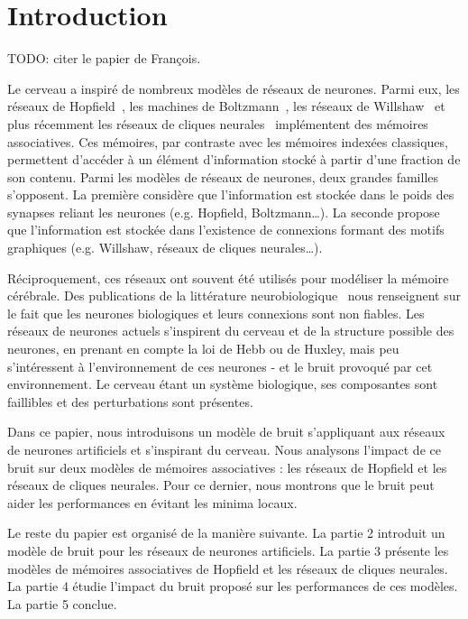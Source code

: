 \documentclass{gretsi}
\begin{document}
\maketitle

\section{Introduction}

TODO: citer le papier de François.

Le cerveau a inspiré de nombreux modèles de réseaux de neurones. Parmi eux, les réseaux de Hopfield~\cite{}, les machines de Boltzmann~\cite{}, les réseaux de Willshaw~\cite{} et plus récemment les réseaux de cliques neurales~\cite{} implémentent des mémoires associatives. Ces mémoires, par contraste avec les mémoires indexées classiques, permettent d'accéder à un élément d'information stocké à partir d'une fraction de son contenu. Parmi les modèles de réseaux de neurones, deux grandes familles s'opposent. La première considère que l'information est stockée dans le poids des synapses reliant les neurones (e.g. Hopfield, Boltzmann\dots). La seconde propose que l'information est stockée dans l'existence de connexions formant des motifs graphiques (e.g. Willshaw, réseaux de cliques neurales\dots).

Réciproquement, ces réseaux ont souvent été utilisés pour modéliser la mémoire cérébrale. Des publications de la littérature neurobiologique~\cite{} nous renseignent sur le fait que les neurones biologiques et leurs connexions sont non fiables. Les réseaux de neurones actuels s'inspirent du cerveau et de la structure possible des neurones, en prenant en compte la loi de Hebb ou de Huxley, mais peu s'intéressent à l'environnement de ces neurones - et le bruit provoqué par cet environnement. Le cerveau étant un système biologique, ses composantes sont faillibles et des perturbations sont présentes.

Dans ce papier, nous introduisons un modèle de bruit s'appliquant aux réseaux de neurones artificiels et s'inspirant du cerveau. Nous analysons l'impact de ce bruit sur deux modèles de mémoires associatives : les réseaux de Hopfield et les réseaux de cliques neurales. Pour ce dernier, nous montrons que le bruit peut aider les performances en évitant les minima locaux.

Le reste du papier est organisé de la manière suivante. La partie 2 introduit un modèle de bruit pour les réseaux de neurones artificiels. La partie 3 présente les modèles de mémoires associatives de Hopfield et les réseaux de cliques neurales. La partie 4 étudie l'impact du bruit proposé sur les performances de ces modèles. La partie 5 conclue.
\end{document}
